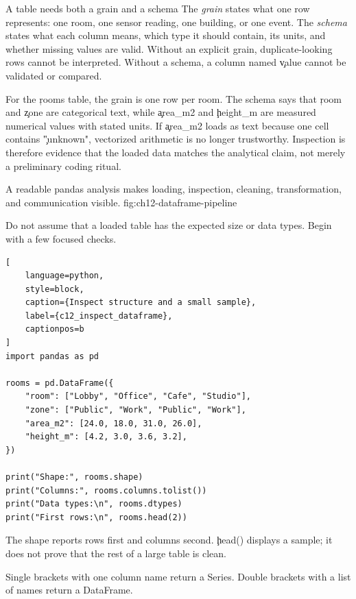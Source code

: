 \begin{ExplainBox}{A table needs both a grain and a schema}
The \emph{grain} states what one row represents: one room, one sensor reading,
one building, or one event. The \emph{schema} states what each column means,
which type it should contain, its units, and whether missing values are valid.
Without an explicit grain, duplicate-looking rows cannot be interpreted.
Without a schema, a column named \c{value} cannot be validated or compared.
\end{ExplainBox}

For the \c{rooms} table, the grain is one row per room. The schema says that
\c{room} and \c{zone} are categorical text, while \c{area_m2} and
\c{height_m} are measured numerical values with stated units. If
\c{area_m2} loads as text because one cell contains \c{"unknown"}, vectorized
arithmetic is no longer trustworthy. Inspection is therefore evidence that
the loaded data matches the analytical claim, not merely a preliminary coding
ritual.

{A readable pandas analysis makes loading, inspection, cleaning, transformation, and communication visible.}
{fig:ch12-dataframe-pipeline}


Do not assume that a loaded table has the expected size or data types. Begin
with a few focused checks.

\begin{lstlisting}[
    language=python,
    style=block,
    caption={Inspect structure and a small sample},
    label={c12_inspect_dataframe},
    captionpos=b
]
import pandas as pd

rooms = pd.DataFrame({
    "room": ["Lobby", "Office", "Cafe", "Studio"],
    "zone": ["Public", "Work", "Public", "Work"],
    "area_m2": [24.0, 18.0, 31.0, 26.0],
    "height_m": [4.2, 3.0, 3.6, 3.2],
})

print("Shape:", rooms.shape)
print("Columns:", rooms.columns.tolist())
print("Data types:\n", rooms.dtypes)
print("First rows:\n", rooms.head(2))
\end{lstlisting}

The shape reports rows first and columns second. \c{head()} displays a sample;
it does not prove that the rest of a large table is clean.


Single brackets with one column name return a Series. Double brackets with a
list of names return a DataFrame.

